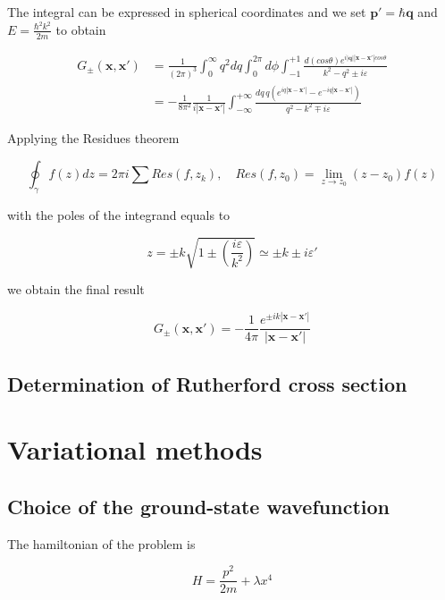 \documentclass{article}
\begin{document}
The integral can be expressed in spherical coordinates and we set \(\bm{p'} = \hbar\bm{q} \) and \( E = \frac{\hbar^2k^2}{2m} \) to obtain

\begin{align}
G_{\pm}(\bm{x},\bm{x'}) & = \frac{1}{(2\pi)^3} \int_0^{\infty} q^2 dq \int_0^{2\pi} d\phi \int_{-1}^{+1} \frac{d(cos\theta)e^{i|\bm{q}||\bm{x}-\bm{x'}|cos\theta}}{k^2-q^2\pm i\varepsilon} \nonumber \\
& = -\frac{1}{8\pi^2} \frac{1}{i|\bm{x}-\bm{x'}|} \int_{-\infty}^{+\infty} \frac{dq \, q \left( e^{iq|\bm{x}-\bm{x'}|} - e^{-iq|\bm{x}-\bm{x'}|} \right)}{q^2 - k^2 \mp i\varepsilon}
\end{align}

Applying the Residues theorem

\begin{equation}
\oint_{\gamma} f(z) dz = 2\pi i \sum Res(f,z_k), \quad Res(f,z_0) = \lim_{z\to z_0}(z-z_0)f(z) 
\end{equation}

with the poles of the integrand equals to

\begin{equation}
z = \pm k \sqrt{1\pm \left(\frac{i\varepsilon}{k^2}\right)} \simeq \pm k \pm i\varepsilon'
\end{equation}

we obtain the final result

\begin{equation}
G_{\pm}(\bm{x},\bm{x'}) = -\frac{1}{4\pi} \frac{e^{\pm ik |\bm{x}-\bm{x'}|}}{|\bm{x}-\bm{x'}|}
\end{equation}

\subsection{Determination of Rutherford cross section}


\section{Variational methods}

\subsection{Choice of the ground-state wavefunction}
The hamiltonian of the problem is

\begin{equation}
H = \frac{p^2}{2m} + \lambda x^4
\end{equation}
\end{document}
